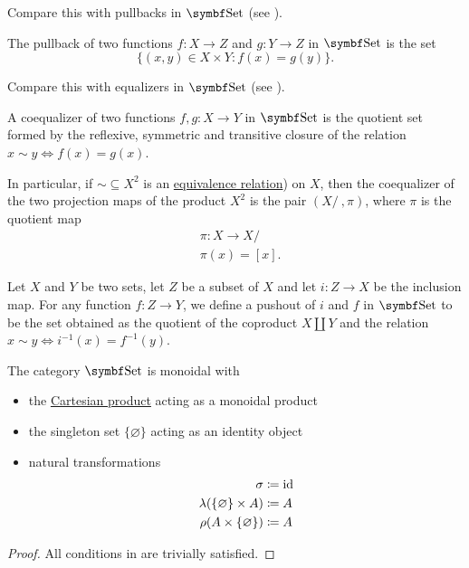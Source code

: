 \begin{proposition}
\begin{defenum}
    Compare this with pullbacks in \( \Cat{Set} \) (see ).

     The pullback of two functions \( f: X \to Z \) and \( g: Y \to Z \) in \( \Cat{Set} \) is the set
    \begin{equation*}
      \{ (x, y) \in X \times Y \colon f(x) = g(y) \}.
    \end{equation*}

    Compare this with equalizers in \( \Cat{Set} \) (see ).

     A coequalizer of two functions \( f, g: X \to Y \) in \( \Cat{Set} \) is the quotient set formed by the reflexive, symmetric and transitive closure of the relation \( x \sim y \iff f(x) = g(x) \).

    In particular, if \( \sim \subseteq X^2 \) is an \hyperref[def:equivalence_relation]{equivalence relation}) on \( X \), then the coequalizer of the two projection maps of the product \( X^2 \) is the pair \( (X / ~, \pi) \), where \( \pi \) is the quotient map
    \begin{align*}
      &\pi: X \to X / ~ \\
      &\pi(x) = [x].
    \end{align*}

     Let \( X \) and \( Y \) be two sets, let \( Z \) be a subset of \( X \) and let \( i: Z \to X \) be the inclusion map. For any function \( f: Z \to Y \), we define a pushout of \( i \) and \( f \) in \( \Cat{Set} \) to be the set obtained as the quotient of the coproduct \( X \coprod Y \) and the relation \( x \sim y \iff i^{-1}(x) = f^{-1}(y) \).
  \end{defenum}
\end{proposition}

\begin{proposition}\label{thm:set_is_monoidal}
  The category \( \Cat{Set} \) is monoidal with
  \begin{itemize}
    \item the \hyperref[def:cartesian_product]{Cartesian product} acting as a monoidal product
    \item the singleton set \( \{ \varnothing \} \) acting as an identity object
    \item natural transformations
    \begin{align*}
      \sigma &\coloneqq \operatorname{id} \\
      \lambda(\{ \varnothing \} \times A) &\coloneqq A \\
      \rho(A \times \{ \varnothing \}) &\coloneqq A
    \end{align*}
  \end{itemize}
\end{proposition}
\begin{proof}
  All conditions in  are trivially satisfied.
\end{proof}
